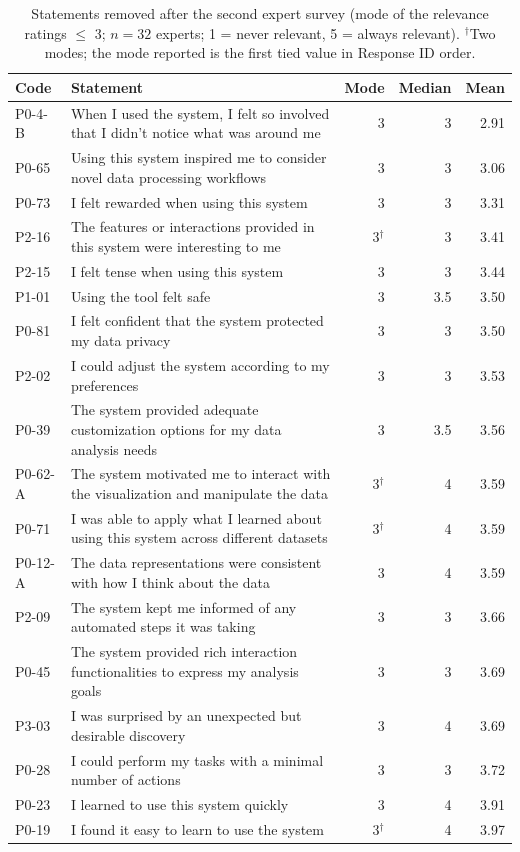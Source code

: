 \begin{table}[tbp]
\centering
\caption{Statements removed after the second expert survey (mode of the relevance ratings $\leq$ 3; $n = 32$ experts; 1 = never relevant, 5 = always relevant). $^{\dagger}$Two modes; the mode reported is the first tied value in Response ID order.}
\label{tab:removed-statements}
\small
\begin{tabular}{llrrr}
\toprule
Code & Statement & Mode & Median & Mean \\
\midrule
P0-4-B & When I used the system, I felt so involved that I didn't notice what was around me & 3 & 3 & 2.91 \\
P0-65 & Using this system inspired me to consider novel data processing workflows & 3 & 3 & 3.06 \\
P0-73 & I felt rewarded when using this system & 3 & 3 & 3.31 \\
P2-16 & The features or interactions provided in this system were interesting to me & 3$^{\dagger}$ & 3 & 3.41 \\
P2-15 & I felt tense when using this system & 3 & 3 & 3.44 \\
P1-01 & Using the tool felt safe & 3 & 3.5 & 3.50 \\
P0-81 & I felt confident that the system protected my data privacy & 3 & 3 & 3.50 \\
P2-02 & I could adjust the system according to my preferences & 3 & 3 & 3.53 \\
P0-39 & The system provided adequate customization options for my data analysis needs & 3 & 3.5 & 3.56 \\
P0-62-A & The system motivated me to interact with the visualization and manipulate the data & 3$^{\dagger}$ & 4 & 3.59 \\
P0-71 & I was able to apply what I learned about using this system across different datasets & 3$^{\dagger}$ & 4 & 3.59 \\
P0-12-A & The data representations were consistent with how I think about the data & 3 & 4 & 3.59 \\
P2-09 & The system kept me informed of any automated steps it was taking & 3 & 3 & 3.66 \\
P0-45 & The system provided rich interaction functionalities to express my analysis goals & 3 & 3 & 3.69 \\
P3-03 & I was surprised by an unexpected but desirable discovery & 3 & 4 & 3.69 \\
P0-28 & I could perform my tasks with a minimal number of actions & 3 & 3 & 3.72 \\
P0-23 & I learned to use this system quickly & 3 & 4 & 3.91 \\
P0-19 & I found it easy to learn to use the system & 3$^{\dagger}$ & 4 & 3.97 \\
\bottomrule
\end{tabular}
\end{table}
